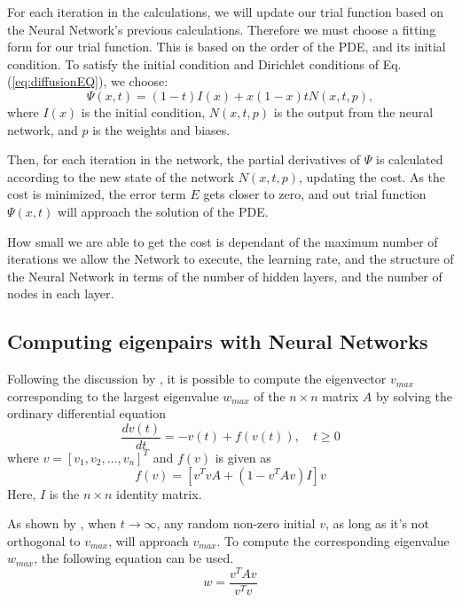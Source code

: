For each iteration in the calculations, we will update our trial function based on the Neural Network's previous calculations. Therefore we must choose a fitting form for our trial function. This is based on the order of the PDE, and its initial condition. To satisfy the initial condition and Dirichlet conditions of Eq. (\ref{eq:diffusionEQ}), we choose:
\begin{equation}
    \Psi (x,t) = (1-t)I(x) + x(1-x)tN(x,t,p),
    \label{eq:trialFunction}
\end{equation}
where $I(x)$ is the initial condition, $N(x,t,p)$ is the output from the neural network, and $p$ is the weights and biases.

Then, for each iteration in the network, the partial derivatives of $\Psi$ is calculated according to the new state of the network $N(x, t, p)$, updating the cost. As the cost is minimized, the error term $E$ gets closer to zero, and out trial function $\Psi (x,t)$ will approach the solution of the PDE. 

How small we are able to get the cost is dependant of the maximum number of iterations we allow the Network to execute, the learning rate, and the structure of the Neural Network in terms of the number of hidden layers, and the number of nodes in each layer.

\subsection{Computing eigenpairs with Neural Networks}
Following the discussion by \cite{yi2004neural}, it is possible to compute the eigenvector $v_{max}$ corresponding to the largest eigenvalue $w_{max}$ of the $n\times n$ matrix $A$ by solving the ordinary differential equation
\begin{equation}\label{eq:eigenDE}
	\frac{dv(t)}{dt} = -v(t) + f(v(t)), \quad t\geq 0
\end{equation}
 where $v = [v_1,v_2,\ldots,v_n]^T$ and $f(v)$ is given as
 \begin{equation}\label{eq:f}
 f(v) = \left[v^TvA + \left(1-v^TAv\right)I\right]v
 \end{equation}
Here, $I$ is the $n\times n$ identity matrix. 

As shown by \cite{yi2004neural}, when $t\rightarrow \infty$, any random non-zero initial $v$, as long as it's not orthogonal to $v_{max}$, will approach $v_{max}$. To compute the corresponding eigenvalue $w_{max}$, the following equation can be used.
\begin{equation*}\label{eq:find_w}
	w = \frac{v^TAv}{v^Tv}
\end{equation*}

